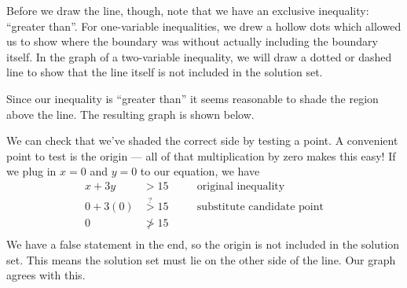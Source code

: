 Before we draw the line, though, note that we have an exclusive inequality: ``greater than''. For one-variable inequalities, we drew a hollow dots which allowed us to show where the boundary was without actually including the boundary itself. In the graph of a two-variable inequality, we will draw a dotted or dashed line to show that the line itself is not included in the solution set.

Since our inequality is ``greater than'' it seems reasonable to shade the region above the line. The resulting graph is shown below.

\begin{center}
\end{center}

We can check that we've shaded the correct side by testing a point. A convenient point to test is the origin --- all of that multiplication by zero makes this easy! If we plug in $x = 0$ and $y = 0$ to our equation, we have
\[\begin{aligned}
x+3y &> 15
&& \quad\text{original inequality}\\
0+3(0) &\overset{?}{>} 15
&& \quad\text{substitute candidate point}\\
0 &{\ngtr} 15
&& \quad\text{}\\
\end{aligned}\]
We have a false statement in the end, so the origin is not included in the solution set. This means the solution set must lie on the other side of the line. Our graph agrees with this.

